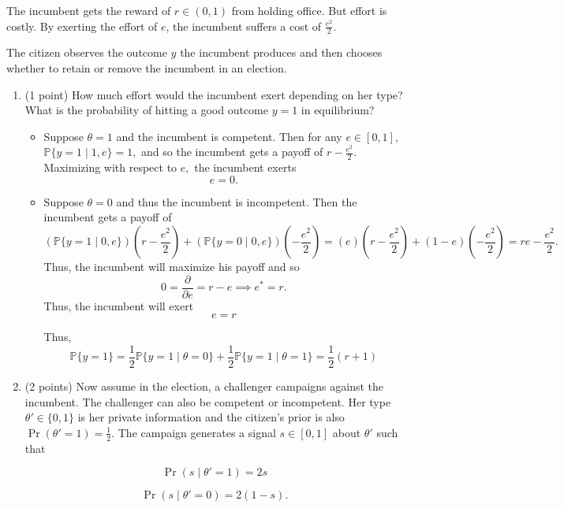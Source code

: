 \documentclass[11pt]{article}
\newcommand{\bbP}{\mathbb{P}}
\begin{document}
The incumbent gets the reward of \( r \in (0, 1) \) from holding office. But effort is costly. 
By exerting the effort of \( e \), the incumbent suffers a cost of $\frac{e^2}{2}.$

The citizen observes the outcome \( y \) the incumbent produces and then chooses whether 
to retain or remove the incumbent in an election.
    \begin{enumerate}


        \item (1 point)
        How much effort would the incumbent exert depending on her type? What is the probability of hitting a good outcome $y = 1$ in equilibrium?
\begin{solution}
\begin{itemize}
    \item Suppose $\theta = 1$ and the incumbent is competent. Then for any $e\in [0,1],$ $\bbP\{y = 1 \mid 1,e\} = 1,$ and so the incumbent gets a payoff of $r - \frac{e^2}{2}.$ Maximizing with respect to $e,$ the incumbent exerts 
    \[\boxed{e = 0}.\]
    \item Suppose $\theta = 0$ and thus the incumbent is incompetent. Then the incumbent gets a payoff of 
    \[(\bbP\{y = 1 \mid 0, e\})(r - \frac{e^2}{2}) + (\bbP\{y = 0 \mid 0, e\})(-\frac{e^2}{2}) = (e)(r - \frac{e^2}{2}) + (1-e)(-\frac{e^2}{2})= re - \frac{e^2}{2}.\] Thus, the incumbent will maximize his payoff and so 
    \[0 = \frac{\partial }{\partial e}= r -e \implies e^* = r.\] Thus, the incumbent will exert 
    \[\boxed{e =r}\]

    Thus, 
    \[\bbP\{y =1 \} = \frac{1}{2}\bbP\{y =1 \mid \theta = 0\} + \frac{1}{2}\bbP\{y = 1 \mid \theta = 1\} = \boxed{\frac{1}{2}(r + 1)}\]
\end{itemize}
\end{solution}

        \item (2 points) Now assume in the election, a challenger campaigns against the incumbent. The challenger can also be competent or incompetent. Her type $\theta' \in \{0, 1\}$ is her private information and the citizen’s prior is also $\Pr(\theta' = 1) = \frac{1}{2}$.
        The campaign generates a signal \( s \in [0, 1] \) about \( \theta' \) such that

\[
\Pr(s \mid \theta' = 1) = 2s
\]

\[
\Pr(s \mid \theta' = 0) = 2(1 - s).
\]
        

\end{enumerate}
\end{document}
